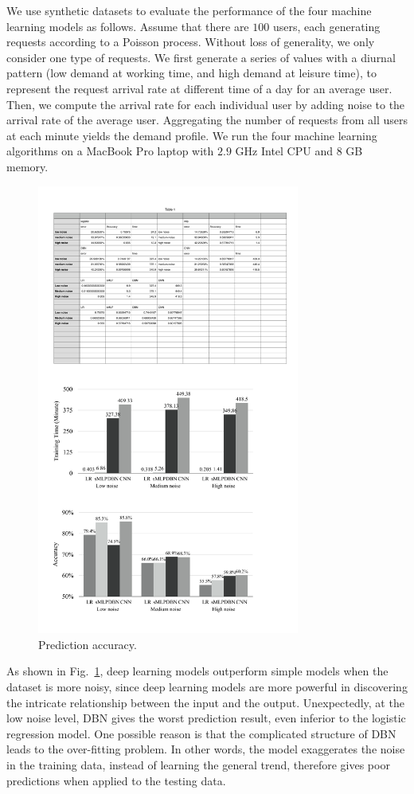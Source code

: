 We use synthetic datasets to evaluate the performance of the four machine learning models as follows. Assume that there are $100$ users, each generating requests according to a Poisson process. Without loss of generality, we only consider one type of requests. We first generate a series of values with a diurnal pattern (low demand at working time, and high demand at leisure time), to represent the request arrival rate at different time of a day for an average user. Then, we compute the arrival rate for each individual user by adding noise to the arrival rate of the average user. Aggregating the number of requests from all users at each minute yields the demand profile. We run the four machine learning algorithms on a MacBook Pro laptop with $2.9$ GHz Intel CPU and 8 GB memory.     


\begin{figure}[t]
	\center
	\hspace{-0.4cm}
	\includegraphics[trim = 0mm 0mm 0mm 12mm,clip,width=3.4in]{figs/acc}
	\caption{Prediction accuracy.} \label{fig:acc}
\end{figure}

As shown in Fig.~\ref{fig:acc}, deep learning models outperform simple models when the dataset is more noisy, since deep learning models are more powerful in discovering the intricate relationship between the input and the output. Unexpectedly, at the low noise level, DBN gives the worst prediction result, even inferior to the logistic regression model. One possible reason is that the complicated structure of DBN leads to the over-fitting problem. In other words, the model exaggerates the noise in the training data, instead of learning the general trend, therefore gives poor predictions when applied to the testing data. 

